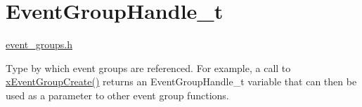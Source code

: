 \hypertarget{group___event_group_handle__t}{}\section{Event\+Group\+Handle\+\_\+t}
\label{group___event_group_handle__t}
\hyperlink{event__groups_8h}{event\+\_\+groups.\+h}

Type by which event groups are referenced. For example, a call to \hyperlink{event__groups_8h_a7ed741a0902718aca9c8d3ca273f1b73}{x\+Event\+Group\+Create()} returns an Event\+Group\+Handle\+\_\+t variable that can then be used as a parameter to other event group functions. 